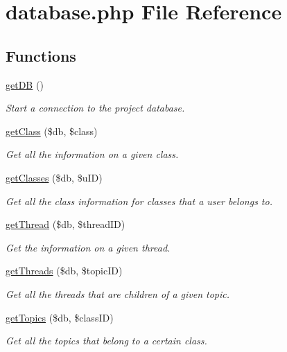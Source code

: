 \hypertarget{database_8php}{}\section{database.\+php File Reference}
\label{database_8php}
\subsection*{Functions}
\begin{DoxyCompactItemize}
\item 
\mbox{\hyperlink{database_8php_a4162847310de81b83504109485866a7c}{get\+DB}} ()
\begin{DoxyCompactList}\small\item\em Start a connection to the project database. \end{DoxyCompactList}\item 
\mbox{\hyperlink{database_8php_a5cf535e8b0f28eb83d0f36dc6eadc494}{get\+Class}} (\$db, \$class)
\begin{DoxyCompactList}\small\item\em Get all the information on a given class. \end{DoxyCompactList}\item 
\mbox{\hyperlink{database_8php_a334f0b901f0d9e607df81e722e2f3458}{get\+Classes}} (\$db, \$u\+ID)
\begin{DoxyCompactList}\small\item\em Get all the class information for classes that a user belongs to. \end{DoxyCompactList}\item 
\mbox{\hyperlink{database_8php_a4703ef9116dadf19e01d244f00ae284e}{get\+Thread}} (\$db, \$thread\+ID)
\begin{DoxyCompactList}\small\item\em Get the information on a given thread. \end{DoxyCompactList}\item 
\mbox{\hyperlink{database_8php_a4f2da32a6120739b75f858cbf52eff0f}{get\+Threads}} (\$db, \$topic\+ID)
\begin{DoxyCompactList}\small\item\em Get all the threads that are children of a given topic. \end{DoxyCompactList}\item 
\mbox{\hyperlink{database_8php_ad32b3315782f9584aa725a4d5f8bbd3b}{get\+Topics}} (\$db, \$class\+ID)
\begin{DoxyCompactList}\small\item\em Get all the topics that belong to a certain class. \end{DoxyCompactList}\item 

\end{DoxyCompactItemize}
